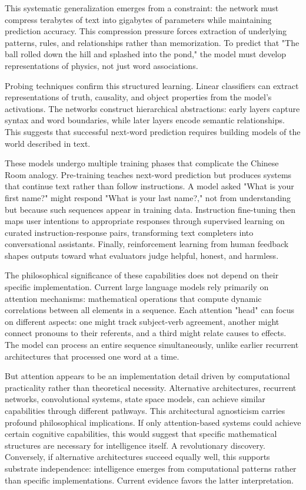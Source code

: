 This systematic generalization emerges from a constraint: the network must compress terabytes of text into gigabytes of parameters while maintaining prediction accuracy. This compression pressure forces extraction of underlying patterns, rules, and relationships rather than memorization. To predict that "The ball rolled down the hill and splashed into the pond," the model must develop representations of physics, not just word associations.

Probing techniques confirm this structured learning. Linear classifiers can extract representations of truth, causality, and object properties from the model's activations. The networks construct hierarchical abstractions: early layers capture syntax and word boundaries, while later layers encode semantic relationships. This suggests that successful next-word prediction requires building models of the world described in text.

These models undergo multiple training phases that complicate the Chinese Room analogy. Pre-training teaches next-word prediction but produces systems that continue text rather than follow instructions. A model asked "What is your first name?" might respond "What is your last name?," not from understanding but because such sequences appear in training data. Instruction fine-tuning then maps user intentions to appropriate responses through supervised learning on curated instruction-response pairs, transforming text completers into conversational assistants. Finally, reinforcement learning from human feedback shapes outputs toward what evaluators judge helpful, honest, and harmless.

The philosophical significance of these capabilities does not depend on their specific implementation. Current large language models rely primarily on attention mechanisms: mathematical operations that compute dynamic correlations between all elements in a sequence. Each attention "head" can focus on different aspects: one might track subject-verb agreement, another might connect pronouns to their referents, and a third might relate causes to effects. The model can process an entire sequence simultaneously, unlike earlier recurrent architectures that processed one word at a time.

But attention appears to be an implementation detail driven by computational practicality rather than theoretical necessity. Alternative architectures, recurrent networks, convolutional systems, state space models, can achieve similar capabilities through different pathways. This architectural agnosticism carries profound philosophical implications. If only attention-based systems could achieve certain cognitive capabilities, this would suggest that specific mathematical structures are necessary for intelligence itself. A revolutionary discovery. Conversely, if alternative architectures succeed equally well, this supports substrate independence: intelligence emerges from computational patterns rather than specific implementations. Current evidence favors the latter interpretation.

